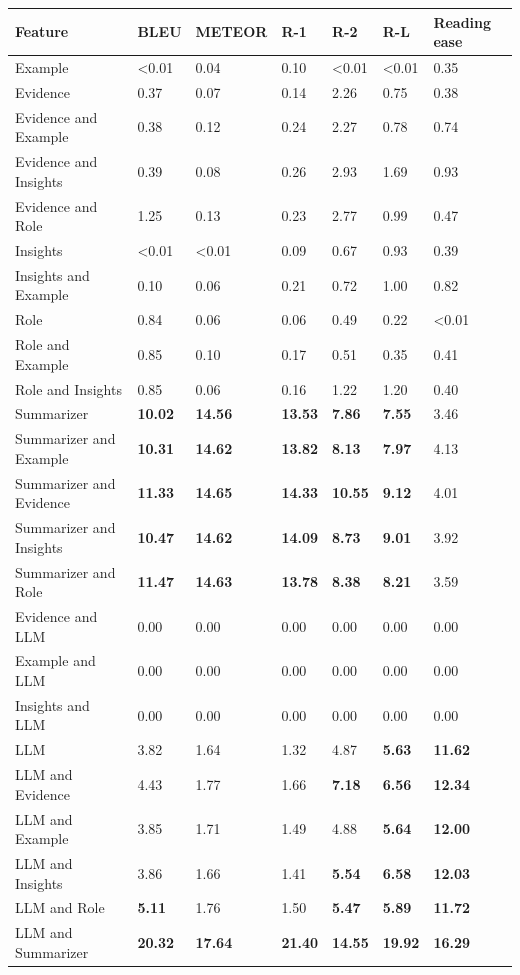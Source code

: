 \begin{tabular}{|l|l|l|l|l|l|l|}
\hline
\textbf{Feature} & BLEU & METEOR & R-1 & R-2 & R-L & Reading ease \\
 \hline
 Example & \textless{}0.01 & 0.04 & 0.10 & \textless{}0.01 & \textless{}0.01 & 0.35 \\
 \hline
 Evidence & 0.37 & 0.07 & 0.14 & 2.26 & 0.75 & 0.38 \\
 \hline
 Evidence and Example & 0.38 & 0.12 & 0.24 & 2.27 & 0.78 & 0.74 \\
 \hline
 Evidence and Insights & 0.39 & 0.08 & 0.26 & 2.93 & 1.69 & 0.93 \\
 \hline
 Evidence and Role & 1.25 & 0.13 & 0.23 & 2.77 & 0.99 & 0.47 \\
 \hline
 Insights & \textless{}0.01 & \textless{}0.01 & 0.09 & 0.67 & 0.93 & 0.39 \\
 \hline
 Insights and Example & 0.10 & 0.06 & 0.21 & 0.72 & 1.00 & 0.82 \\
 \hline
 Role & 0.84 & 0.06 & 0.06 & 0.49 & 0.22 & \textless{}0.01 \\
 \hline
 Role and Example & 0.85 & 0.10 & 0.17 & 0.51 & 0.35 & 0.41 \\
 \hline
 Role and Insights & 0.85 & 0.06 & 0.16 & 1.22 & 1.20 & 0.40 \\
 \hline
 Summarizer & \textbf{10.02} & \textbf{14.56} & \textbf{13.53} & \textbf{7.86} & \textbf{7.55} & 3.46 \\
 \hline
 Summarizer and Example & \textbf{10.31} & \textbf{14.62} & \textbf{13.82} & \textbf{8.13} & \textbf{7.97} & 4.13 \\
 \hline
 Summarizer and Evidence & \textbf{11.33} & \textbf{14.65} & \textbf{14.33} & \textbf{10.55} & \textbf{9.12} & 4.01 \\
 \hline
 Summarizer and Insights & \textbf{10.47} & \textbf{14.62} & \textbf{14.09} & \textbf{8.73} & \textbf{9.01} & 3.92 \\
 \hline
 Summarizer and Role & \textbf{11.47} & \textbf{14.63} & \textbf{13.78} & \textbf{8.38} & \textbf{8.21} & 3.59 \\
 \hline
 Evidence and LLM & 0.00 & 0.00 & 0.00 & 0.00 & 0.00 & 0.00 \\
 \hline
 Example and LLM & 0.00 & 0.00 & 0.00 & 0.00 & 0.00 & 0.00 \\
 \hline
 Insights and LLM & 0.00 & 0.00 & 0.00 & 0.00 & 0.00 & 0.00 \\
 \hline
 LLM & 3.82 & 1.64 & 1.32 & 4.87 & \textbf{5.63} & \textbf{11.62} \\
 \hline
 LLM and Evidence & 4.43 & 1.77 & 1.66 & \textbf{7.18} & \textbf{6.56} & \textbf{12.34} \\
 \hline
 LLM and Example & 3.85 & 1.71 & 1.49 & 4.88 & \textbf{5.64} & \textbf{12.00} \\
 \hline
 LLM and Insights & 3.86 & 1.66 & 1.41 & \textbf{5.54} & \textbf{6.58} & \textbf{12.03} \\
 \hline
 LLM and Role & \textbf{5.11} & 1.76 & 1.50 & \textbf{5.47} & \textbf{5.89} & \textbf{11.72} \\
 \hline
 LLM and Summarizer & \textbf{20.32} & \textbf{17.64} & \textbf{21.40} & \textbf{14.55} & \textbf{19.92} & \textbf{16.29} \\
\hline
\end{tabular}
